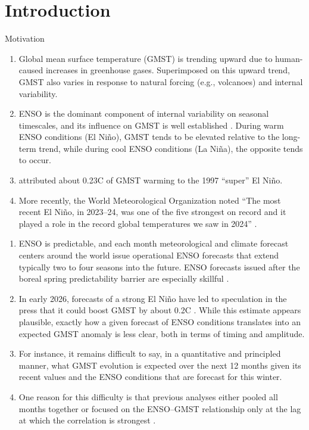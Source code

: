 \documentclass[aspectratio=169,xcolor=dvipsnames]{beamer}
\begin{document}
\setcounter{section}{0}
\section{Introduction}

\begin{frame}{Motivation}
  \begin{enumerate}\tiny 
  \item Global mean surface temperature (GMST) is trending upward due
    to human-caused increases in greenhouse gases. Superimposed on
    this upward trend, GMST also varies in response to natural forcing
    (e.g., volcanoes) and internal variability.
  \item ENSO is the dominant component of internal variability on
    seasonal timescales, and its influence on GMST is well established
    \citep[e.g.,][]{Trenberth2002evolution}. During warm ENSO
    conditions (El Ni\~no), GMST tends to be elevated relative to the
    long-term trend, while during cool ENSO conditions (La Ni\~na),
    the opposite tends to occur.
  \item \citet{Lean2008natural} attributed about 0.23\textdegree C of
    GMST warming to the 1997 ``super'' El Ni\~no.
  \item More recently, the World Meteorological Organization noted
    ``The most recent El Ni\~no, in 2023--24, was one of the five
    strongest on record and it played a role in the record global
    temperatures we saw in 2024'' \citep{WMO2026enso}.

  \end{enumerate}

  \begin{enumerate}\tiny
  \item ENSO is predictable, and each month meteorological and climate
    forecast centers around the world issue operational ENSO forecasts
    that extend typically two to four seasons into the future.  ENSO
    forecasts issued after the boreal spring predictability barrier
    are especially skillful \citep[e.g.,][]{Heureux:Chapter}.
  \item In early 2026, forecasts of a strong El Ni\~no have led to
    speculation in the press that it could boost GMST by about
    0.2\textdegree C \citep[e.g.,][]{KeithLucas2026SuperElNino}.
    While this estimate appears plausible, exactly how a given
    forecast of ENSO conditions translates into an expected GMST
    anomaly is less clear, both in terms of timing and amplitude.
  \item For instance, it remains difficult to say, in a quantitative
    and principled manner, what GMST evolution is expected over the
    next 12 months given its recent values and the ENSO conditions
    that are forecast for this winter.
  \item One reason for this difficulty is that previous analyses
    either pooled all months together \citep{Trenberth2002evolution}
    or focused on the ENSO–GMST relationship only at the lag at which
    the correlation is strongest
    \citep{Lean2008natural,Foster2011global}.
  \end{enumerate}
  

\end{frame}
\end{document}
